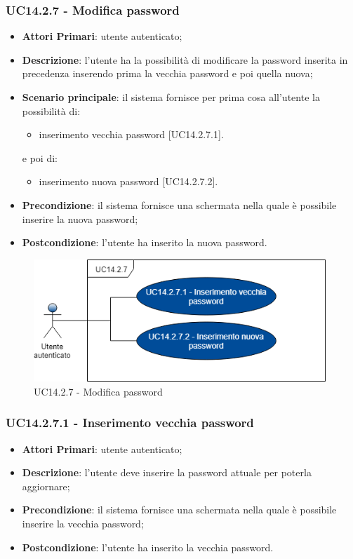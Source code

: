 \subsubsection{UC14.2.7 - Modifica password}
\begin{itemize}
	\item \textbf{Attori Primari}: utente autenticato;
	\item \textbf{Descrizione}: l'utente ha la possibilità di modificare la password inserita in precedenza inserendo prima la vecchia password e poi quella nuova;
	\item \textbf{Scenario principale}: il sistema fornisce per prima cosa all'utente la possibilità di:
		\begin{itemize}
			\item inserimento vecchia password [UC14.2.7.1].
		\end{itemize}
	e poi di:
		\begin{itemize}
			\item inserimento nuova password [UC14.2.7.2].
		\end{itemize}
	\item \textbf{Precondizione}: il sistema fornisce una schermata nella quale è possibile inserire la nuova password;
	\item \textbf{Postcondizione}: l'utente ha inserito la nuova password.
\end{itemize}
\begin{figure}[h]
	\includegraphics[width=11cm]{res/images/UC14-27Password.png}
	\centering
	\caption{UC14.2.7 - Modifica password}
\end{figure}
\subsubsection{UC14.2.7.1 - Inserimento vecchia password}
\begin{itemize}
	\item \textbf{Attori Primari}: utente autenticato;
	\item \textbf{Descrizione}: l'utente deve inserire la password attuale per poterla aggiornare;
	\item \textbf{Precondizione}: il sistema fornisce una schermata nella quale è possibile inserire la vecchia password;
	\item \textbf{Postcondizione}: l'utente ha inserito la vecchia password.
\end{itemize}

